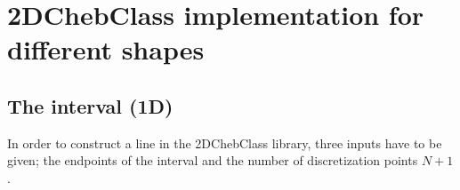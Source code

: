 %
%
%
%
%
%
%
%
%
%

\section{2DChebClass implementation for different shapes}	
\subsection{The interval (1D)}
In order to construct a line in the 2DChebClass library, three inputs have to be given; the endpoints of the interval and the number of discretization points $N+1$.
